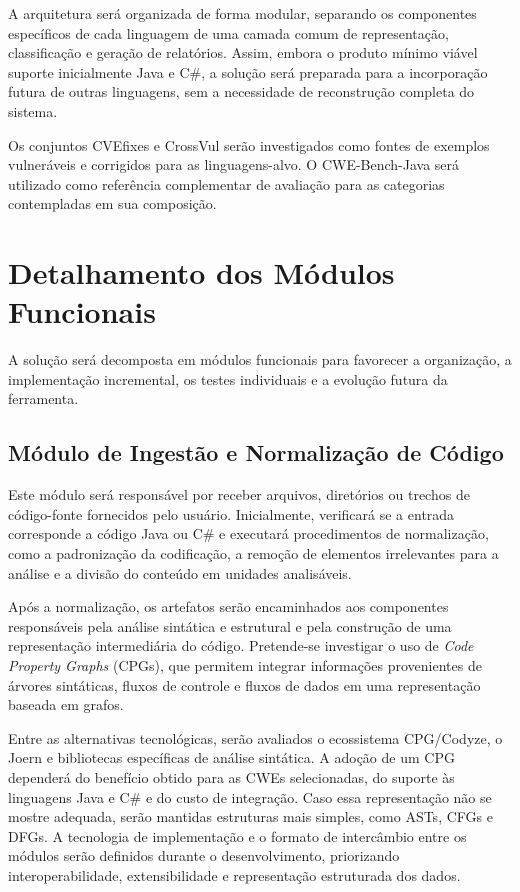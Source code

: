 A arquitetura será organizada de forma modular, separando os componentes
específicos de cada linguagem de uma camada comum de representação,
classificação e geração de relatórios. Assim, embora o produto mínimo
viável suporte inicialmente Java e C\#, a solução será preparada para a
incorporação futura de outras linguagens, sem a necessidade de
reconstrução completa do sistema.

Os conjuntos CVEfixes e CrossVul serão investigados como fontes de
exemplos vulneráveis e corrigidos para as linguagens-alvo. O
CWE-Bench-Java será utilizado como referência complementar de avaliação
para as categorias contempladas em sua composição.

\section{Detalhamento dos Módulos Funcionais}

A solução será decomposta em módulos funcionais para favorecer a
organização, a implementação incremental, os testes individuais e a
evolução futura da ferramenta.

\subsection{Módulo de Ingestão e Normalização de Código}

Este módulo será responsável por receber arquivos, diretórios ou trechos
de código-fonte fornecidos pelo usuário. Inicialmente, verificará se a
entrada corresponde a código Java ou C\# e executará procedimentos de
normalização, como a padronização da codificação, a remoção de elementos
irrelevantes para a análise e a divisão do conteúdo em unidades
analisáveis.

Após a normalização, os artefatos serão encaminhados aos componentes
responsáveis pela análise sintática e estrutural e pela construção de uma
representação intermediária do código. Pretende-se investigar o uso de
\textit{Code Property Graphs} (CPGs), que permitem integrar informações
provenientes de árvores sintáticas, fluxos de controle e fluxos de dados
em uma representação baseada em grafos.

Entre as alternativas tecnológicas, serão avaliados o ecossistema
CPG/Codyze, o Joern e bibliotecas específicas de análise sintática. A
adoção de um CPG dependerá do benefício obtido para as CWEs selecionadas,
do suporte às linguagens Java e C\# e do custo de integração. Caso essa
representação não se mostre adequada, serão mantidas estruturas mais
simples, como ASTs, CFGs e DFGs. A tecnologia de implementação e o formato
de intercâmbio entre os módulos serão definidos durante o desenvolvimento,
priorizando interoperabilidade, extensibilidade e representação
estruturada dos dados.

